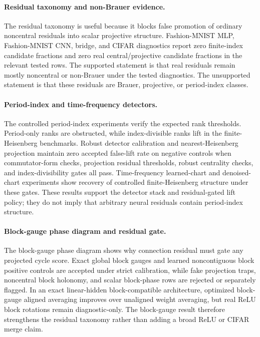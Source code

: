 \paragraph{Residual taxonomy and non-Brauer evidence.}
The residual taxonomy is useful because it blocks false promotion of ordinary noncentral residuals into scalar projective structure. Fashion-MNIST MLP, Fashion-MNIST CNN, bridge, and CIFAR diagnostics report zero finite-index candidate fractions and zero real central/projective candidate fractions in the relevant tested rows. The supported statement is that real residuals remain mostly noncentral or non-Brauer under the tested diagnostics. The unsupported statement is that these residuals are Brauer, projective, or period-index classes.

\paragraph{Period-index and time-frequency detectors.}
The controlled period-index experiments verify the expected rank thresholds. Period-only ranks are obstructed, while index-divisible ranks lift in the finite-Heisenberg benchmarks. Robust detector calibration and nearest-Heisenberg projection maintain zero accepted false-lift rate on negative controls when commutator-form checks, projection residual thresholds, robust centrality checks, and index-divisibility gates all pass. Time-frequency learned-chart and denoised-chart experiments show recovery of controlled finite-Heisenberg structure under these gates. These results support the detector stack and residual-gated lift policy; they do not imply that arbitrary neural residuals contain period-index structure.

\paragraph{Block-gauge phase diagram and residual gate.}
The block-gauge phase diagram shows why connection residual must gate any projected cycle score. Exact global block gauges and learned noncontiguous block positive controls are accepted under strict calibration, while fake projection traps, noncentral block holonomy, and scalar block-phase rows are rejected or separately flagged. In an exact linear-hidden block-compatible architecture, optimized block-gauge aligned averaging improves over unaligned weight averaging, but real ReLU block rotations remain diagnostic-only. The block-gauge result therefore strengthens the residual taxonomy rather than adding a broad ReLU or CIFAR merge claim.

